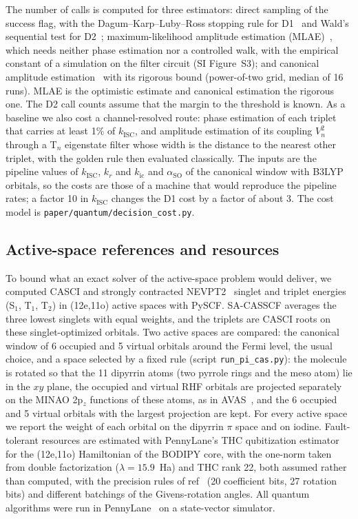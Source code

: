 \documentclass[journal=jctcce,manuscript=article,layout=twocolumn]{achemso}
\newcommand{\kisc}{k_\mathrm{ISC}}
\newcommand{\aso}{\alpha_\mathrm{SO}}
\begin{document}
The number of calls is computed for three estimators: direct sampling of the success flag, with the
Dagum--Karp--Luby--Ross stopping rule for D1~\cite{Dagum2000} and Wald's sequential test for
D2~\cite{Wald1945}; maximum-likelihood amplitude estimation (MLAE)~\cite{Suzuki2020}, which needs neither
phase estimation nor a controlled walk, with the empirical constant of a simulation on the filter circuit
(SI Figure~S3); and canonical amplitude estimation~\cite{Brassard2002} with its rigorous bound
(power-of-two grid, median of 16 runs). MLAE is the optimistic estimate and canonical estimation the
rigorous one. The D2 call counts assume that the margin to the threshold is known. As a baseline we also
cost a channel-resolved route: phase estimation of each triplet that carries at least 1\% of $\kisc$, and
amplitude estimation of its coupling $V_n^2$ through a T$_n$ eigenstate filter whose width is the distance to
the nearest other triplet, with the golden rule then evaluated classically. The inputs are the pipeline
values of $\kisc$, $k_r$ and $k_\mathrm{ic}$ and $\aso$ of the canonical window with B3LYP orbitals, so the
costs are those of a machine that would reproduce the pipeline rates; a factor 10 in $\kisc$ changes the D1
cost by a factor of about 3. The cost model is \texttt{paper/quantum/decision\_cost.py}.

\subsection{Active-space references and resources}

To bound what an exact solver of the active-space problem would deliver, we computed CASCI and
strongly contracted NEVPT2~\cite{Angeli2001} singlet and triplet energies (S$_1$, T$_1$, T$_2$) in
(12e,11o) active spaces with PySCF. SA-CASSCF averages the three lowest singlets with equal weights, and
the triplets are CASCI roots on these singlet-optimized orbitals. Two active spaces are compared: the
canonical window of 6 occupied and 5 virtual orbitals around the Fermi level, the usual choice, and a
space selected by a fixed rule (script \texttt{run\_pi\_cas.py}):
the molecule is rotated so that the 11 dipyrrin atoms (two pyrrole rings and the meso atom) lie in the
$xy$ plane, the occupied and virtual RHF orbitals are projected separately on the MINAO 2p$_z$ functions
of these atoms, as in AVAS~\cite{Sayfutyarova2017}, and the 6 occupied and 5 virtual orbitals with the
largest projection are kept. For every active space we report the weight of each orbital on the dipyrrin
$\pi$ space and on iodine. Fault-tolerant resources are estimated with PennyLane's THC qubitization
estimator for the (12e,11o) Hamiltonian of the BODIPY core, with the one-norm taken from double
factorization ($\lambda=15.9$~Ha) and THC rank 22, both assumed rather than computed, with the precision rules
of ref~ (20 coefficient bits, 27 rotation bits) and different batchings of the
Givens-rotation angles. All quantum algorithms were run in PennyLane~\cite{Bergholm2018} on a
state-vector simulator.
\end{document}
